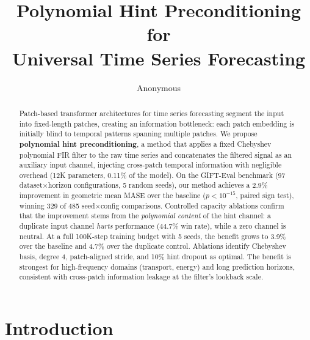 \documentclass[11pt]{article}
\title{Polynomial Hint Preconditioning for\\Universal Time Series Forecasting}
\author{
  Anonymous
}
\begin{document}
\maketitle

\begin{abstract}
Patch-based transformer architectures for time series forecasting segment the input into fixed-length patches, creating an information bottleneck: each patch embedding is initially blind to temporal patterns spanning multiple patches. We propose \textbf{polynomial hint preconditioning}, a method that applies a fixed Chebyshev polynomial FIR filter to the raw time series and concatenates the filtered signal as an auxiliary input channel, injecting cross-patch temporal information with negligible overhead (12K parameters, 0.11\% of the model). On the GIFT-Eval benchmark (97 dataset$\times$horizon configurations, 5 random seeds), our method achieves a 2.9\% improvement in geometric mean MASE over the baseline ($p < 10^{-15}$, paired sign test), winning 329 of 485 seed$\times$config comparisons. Controlled capacity ablations confirm that the improvement stems from the \emph{polynomial content} of the hint channel: a duplicate input channel \emph{hurts} performance (44.7\% win rate), while a zero channel is neutral. At a full 100K-step training budget with 5 seeds, the benefit grows to 3.9\% over the baseline and 4.7\% over the duplicate control. Ablations identify Chebyshev basis, degree 4, patch-aligned stride, and 10\% hint dropout as optimal. The benefit is strongest for high-frequency domains (transport, energy) and long prediction horizons, consistent with cross-patch information leakage at the filter's lookback scale.
\end{abstract}

\section{Introduction}
\end{document}
